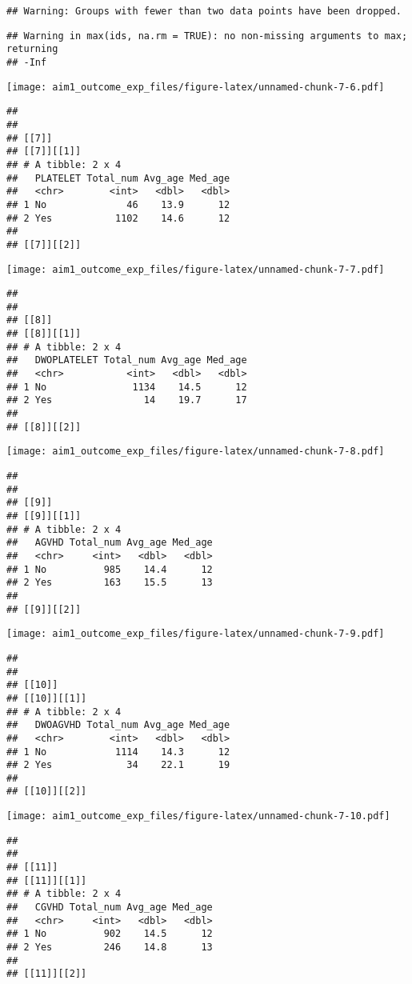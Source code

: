 \documentclass[
]{article}
\begin{document}
\begin{verbatim}
## Warning: Groups with fewer than two data points have been dropped.
\end{verbatim}

\begin{verbatim}
## Warning in max(ids, na.rm = TRUE): no non-missing arguments to max; returning
## -Inf
\end{verbatim}

\texttt{[image: aim1\_outcome\_exp\_files/figure-latex/unnamed-chunk-7-6.pdf]}

\begin{verbatim}
## 
## 
## [[7]]
## [[7]][[1]]
## # A tibble: 2 x 4
##   PLATELET Total_num Avg_age Med_age
##   <chr>        <int>   <dbl>   <dbl>
## 1 No              46    13.9      12
## 2 Yes           1102    14.6      12
## 
## [[7]][[2]]
\end{verbatim}

\texttt{[image: aim1\_outcome\_exp\_files/figure-latex/unnamed-chunk-7-7.pdf]}

\begin{verbatim}
## 
## 
## [[8]]
## [[8]][[1]]
## # A tibble: 2 x 4
##   DWOPLATELET Total_num Avg_age Med_age
##   <chr>           <int>   <dbl>   <dbl>
## 1 No               1134    14.5      12
## 2 Yes                14    19.7      17
## 
## [[8]][[2]]
\end{verbatim}

\texttt{[image: aim1\_outcome\_exp\_files/figure-latex/unnamed-chunk-7-8.pdf]}

\begin{verbatim}
## 
## 
## [[9]]
## [[9]][[1]]
## # A tibble: 2 x 4
##   AGVHD Total_num Avg_age Med_age
##   <chr>     <int>   <dbl>   <dbl>
## 1 No          985    14.4      12
## 2 Yes         163    15.5      13
## 
## [[9]][[2]]
\end{verbatim}

\texttt{[image: aim1\_outcome\_exp\_files/figure-latex/unnamed-chunk-7-9.pdf]}

\begin{verbatim}
## 
## 
## [[10]]
## [[10]][[1]]
## # A tibble: 2 x 4
##   DWOAGVHD Total_num Avg_age Med_age
##   <chr>        <int>   <dbl>   <dbl>
## 1 No            1114    14.3      12
## 2 Yes             34    22.1      19
## 
## [[10]][[2]]
\end{verbatim}

\texttt{[image: aim1\_outcome\_exp\_files/figure-latex/unnamed-chunk-7-10.pdf]}

\begin{verbatim}
## 
## 
## [[11]]
## [[11]][[1]]
## # A tibble: 2 x 4
##   CGVHD Total_num Avg_age Med_age
##   <chr>     <int>   <dbl>   <dbl>
## 1 No          902    14.5      12
## 2 Yes         246    14.8      13
## 
## [[11]][[2]]
\end{verbatim}
\end{document}
